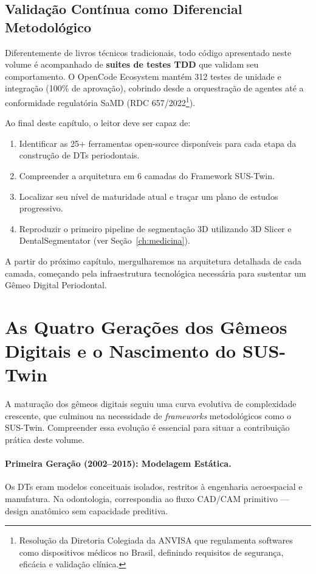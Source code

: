 \subsection{Validação Contínua como Diferencial Metodológico}

Diferentemente de livros técnicos tradicionais, todo código apresentado neste volume é acompanhado de \textbf{suites de testes TDD} que validam seu comportamento. O OpenCode Ecosystem mantém 312 testes de unidade e integração (100\% de aprovação), cobrindo desde a orquestração de agentes até a conformidade regulatória SaMD (RDC 657/2022\footnote[26]{Resolução da Diretoria Colegiada da ANVISA que regulamenta softwares como dispositivos médicos no Brasil, definindo requisitos de segurança, eficácia e validação clínica.}).

Ao final deste capítulo, o leitor deve ser capaz de:
\begin{enumerate}
    \item Identificar as 25+ ferramentas open-source disponíveis para cada etapa da construção de DTs periodontais.
    \item Compreender a arquitetura em 6 camadas do Framework SUS-Twin.
    \item Localizar seu nível de maturidade atual e traçar um plano de estudos progressivo.
    \item Reproduzir o primeiro pipeline de segmentação 3D utilizando 3D Slicer e DentalSegmentator (ver Seção~\ref{ch:medicina}).
\end{enumerate}

A partir do próximo capítulo, mergulharemos na arquitetura detalhada de cada camada, começando pela infraestrutura tecnológica necessária para sustentar um Gêmeo Digital Periodontal.

\section{As Quatro Gerações dos Gêmeos Digitais e o Nascimento do SUS-Twin}

A maturação dos gêmeos digitais seguiu uma curva evolutiva de complexidade crescente, que culminou na necessidade de \textit{frameworks} metodológicos como o SUS-Twin. Compreender essa evolução é essencial para situar a contribuição prática deste volume.

\paragraph{Primeira Geração (2002--2015): Modelagem Estática.}
Os DTs eram modelos conceituais isolados, restritos à engenharia aeroespacial e manufatura. Na odontologia, correspondia ao fluxo CAD/CAM primitivo --- design anatômico sem capacidade preditiva.

